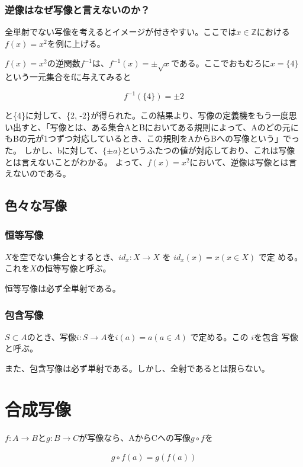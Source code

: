 \documentclass[dvipdfmx,autodetect-engine]{jsarticle}
\begin{document}
\subsubsection{逆像はなぜ写像と言えないのか？}

全単射でない写像を考えるとイメージが付きやすい。ここでは$x \in \mathbb{Z}$における$f(x)=x^2$を例に上げる。

$f(x) = x^2$の逆関数$f^{-1}$は、$f^{-1}(x)=\pm \sqrt{x}$である。ここでおもむろに$x=\{4\}$という一元集合をfに与えてみると

$$
f^{-1}(\{4\}) = {\pm 2}
$$

と\{4\}に対して、\{2, -2\}が得られた。この結果より、写像の定義機をもう一度思い出すと、「写像とは、ある集合AとBにおいてある規則によって、Aのどの元にもBの元が1つずつ対応しているとき、この規則をAからBへの写像という」でった。
しかし、bに対して、$\{\pm a\}$というふたつの値が対応しており、これは写像とは言えないことがわかる。
よって、$f(x) = x^2$において、逆像は写像とは言えないのである。

\subsection{色々な写像}

\subsubsection{恒等写像}

$X$を空でない集合とするとき、$id_x : X → X$ を $id_x(x) = x (x ∈ X)$ で定
める。これを$X$の恒等写像と呼ぶ。

恒等写像は必ず全単射である。

\subsubsection{包含写像}

$S \subset A$のとき、写像$i: S \to A$を$i(a) = a (a \in A)$ で定める。この $i$を包含
写像と呼ぶ。

また、包含写像は必ず単射である。しかし、全射であるとは限らない。

\section{合成写像}

$f: A \to B$と$g: B \to C$が写像なら、AからCへの写像$g \circ f$を

\begin{eqnarray*}
g \circ f(a) = g(f(a))
\end{eqnarray*}
\end{document}
